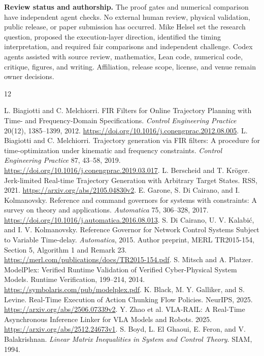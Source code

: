 \documentclass[10pt,letterpaper]{article}
\begin{document}
\textbf{Review status and authorship.}
The proof gates and numerical comparison have independent agent checks.
No external human review, physical validation, public release, or paper
submission has occurred. Mike Helsel set the research question, proposed the
execution-layer direction, identified the timing interpretation, and required
fair comparisons and independent challenge. Codex agents assisted with source
review, mathematics, Lean code, numerical code, critique, figures, and writing.
Affiliation, release scope, license, and venue remain owner decisions.

\begin{thebibliography}{12}\small\raggedright
{} L. Biagiotti and C. Melchiorri.
FIR Filters for Online Trajectory Planning with Time- and Frequency-Domain
Specifications. \emph{Control Engineering Practice} 20(12), 1385--1399, 2012.
\url{https://doi.org/10.1016/j.conengprac.2012.08.005}.
 L. Biagiotti and C. Melchiorri.
Trajectory generation via FIR filters: A procedure for time-optimization under
kinematic and frequency constraints. \emph{Control Engineering Practice}
87, 43--58, 2019. \url{https://doi.org/10.1016/j.conengprac.2019.03.017}.
 L. Berscheid and T. Kr\"oger.
Jerk-limited Real-time Trajectory Generation with Arbitrary Target States.
RSS, 2021. \url{https://arxiv.org/abs/2105.04830v2}.
 E. Garone, S. Di Cairano, and I. Kolmanovsky.
Reference and command governors for systems with constraints: A survey on
theory and applications. \emph{Automatica} 75, 306--328, 2017.
\url{https://doi.org/10.1016/j.automatica.2016.08.013}.
 S. Di Cairano, U. V. Kalabi\'c, and I. V. Kolmanovsky.
Reference Governor for Network Control Systems Subject to Variable Time-delay.
\emph{Automatica}, 2015. Author preprint, MERL TR2015-154, Section 5,
Algorithm 1 and Remark 23.
\url{https://merl.com/publications/docs/TR2015-154.pdf}.
 S. Mitsch and A. Platzer.
ModelPlex: Verified Runtime Validation of Verified Cyber-Physical System Models.
Runtime Verification, 199--214, 2014.
\url{https://symbolaris.com/pub/modelplex.pdf}.
 K. Black, M. Y. Galliker, and S. Levine.
Real-Time Execution of Action Chunking Flow Policies. NeurIPS, 2025.
\url{https://arxiv.org/abs/2506.07339v2}.
 Y. Zhao et al.
VLA-RAIL: A Real-Time Asynchronous Inference Linker for VLA Models and Robots.
2025. \url{https://arxiv.org/abs/2512.24673v1}.
 S. Boyd, L. El Ghaoui, E. Feron, and V. Balakrishnan.
\emph{Linear Matrix Inequalities in System and Control Theory}. SIAM, 1994.

\end{thebibliography}
\end{document}
